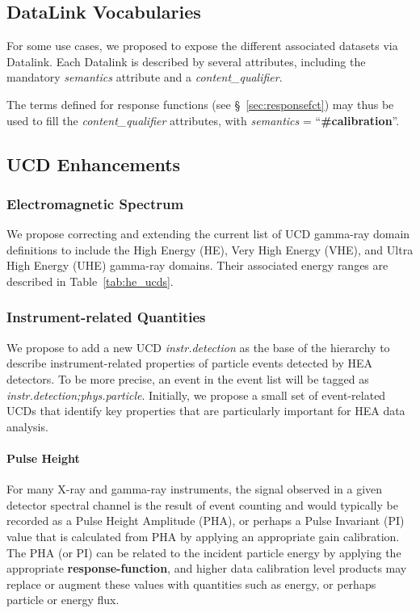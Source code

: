 \documentclass[11pt,a4paper]{ivoa}
\begin{document}
\subsection{DataLink Vocabularies}\label{sec:DLs}

For some use cases, we proposed to expose the different associated datasets via Datalink. Each Datalink is described by several attributes, including the mandatory {\em semantics\/} attribute and a {\em content\_qualifier\/}.

The terms defined for response functions (see \S~\ref{sec:responsefct}) may thus be used to fill the {\em content\_qualifier\/} attributes, with {\em semantics\/} = ``{\bf \#calibration}''.


\subsection{UCD Enhancements}\label{sec:UCDs}

\subsubsection{Electromagnetic Spectrum}

We propose correcting and extending the current list of UCD gamma-ray domain definitions to include the High Energy (HE), Very High Energy (VHE), and Ultra High Energy (UHE) gamma-ray domains.  Their associated energy ranges are described in Table~\ref{tab:he_ucds}.

\subsubsection{Instrument-related Quantities}

We propose to add a new UCD {\em instr.detection\/} as the base of the hierarchy to describe instrument-related properties of particle events detected by \gls{HEA} detectors.  To be more precise, an event in the event list will be tagged as {\em instr.detection;phys.particle\/}. Initially, we propose a small set of event-related UCDs that identify key properties that are particularly important for \gls{HEA} data analysis.

\paragraph{Pulse Height}

For many X-ray and gamma-ray instruments, the signal observed in a given detector spectral channel is the result of event counting and would typically be recorded as a Pulse Height Amplitude (PHA), or perhaps a Pulse Invariant (PI) value that is calculated from PHA by applying an appropriate gain calibration.  The PHA (or PI) can be related to the incident particle energy by applying the appropriate {\bf response-function}, and higher data calibration level products may replace or augment these values with quantities such as energy, or perhaps particle or energy flux.
\end{document}
